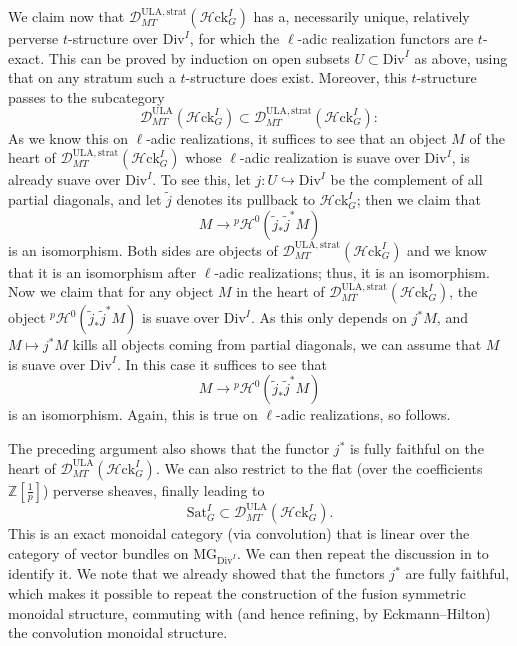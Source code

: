 \documentclass[11pt]{amsart}
\numberwithin{equation}{section}
\numberwithin{theorem}{section}
\theoremstyle{definition}
\newcommand{\Hloc}{{\mathcal H}{\mathrm{ck}}}
\begin{document}
We claim now that $\mathcal D_{MT}^{\mathrm{ULA},\mathrm{strat}}(\Hloc_G^I)$ has a, necessarily unique, relatively perverse $t$-structure over $\mathrm{Div}^I$, for which the $\ell$-adic realization functors are $t$-exact. This can be proved by induction on open subsets $U\subset \mathrm{Div}^I$ as above, using that on any stratum such a $t$-structure does exist. Moreover, this $t$-structure passes to the subcategory
\[
\mathcal D_{MT}^{\mathrm{ULA}}(\Hloc_G^I)\subset \mathcal D_{MT}^{\mathrm{ULA},\mathrm{strat}}(\Hloc_G^I):
\]
As we know this on $\ell$-adic realizations, it suffices to see that an object $M$ of the heart of $\mathcal D_{MT}^{\mathrm{ULA},\mathrm{strat}}(\Hloc_G^I)$ whose $\ell$-adic realization is suave over $\mathrm{Div}^I$, is already suave over $\mathrm{Div}^I$. To see this, let $j: U\hookrightarrow \mathrm{Div}^I$ be the complement of all partial diagonals, and let $\tilde{j}$ denotes its pullback to $\Hloc_G^I$; then we claim that
\[
M\to {}^p\mathcal H^0(\tilde{j}_\ast \tilde{j}^\ast M)
\]
is an isomorphism. Both sides are objects of $\mathcal D_{MT}^{\mathrm{ULA},\mathrm{strat}}(\Hloc_G^I)$ and we know that it is an isomorphism after $\ell$-adic realizations; thus, it is an isomorphism. Now we claim that for any object $M$ in the heart of $\mathcal D_{MT}^{\mathrm{ULA},\mathrm{strat}}(\Hloc_G^I)$, the object ${}^p\mathcal H^0(\tilde{j}_\ast \tilde{j}^\ast M)$ is suave over $\mathrm{Div}^I$. As this only depends on $j^\ast M$, and $M\mapsto j^\ast M$ kills all objects coming from partial diagonals, we can assume that $M$ is suave over $\mathrm{Div}^I$. In this case it suffices to see that
\[
M\to {}^p\mathcal H^0(\tilde{j}_\ast \tilde{j}^\ast M)
\]
is an isomorphism. Again, this is true on $\ell$-adic realizations, so follows.

The preceding argument also shows that the functor $j^\ast$ is fully faithful on the heart of $\mathcal D_{MT}^{\mathrm{ULA}}(\Hloc_G^I)$. We can also restrict to the flat (over the coefficients $\mathbb Z[\tfrac 1p]$) perverse sheaves, finally leading to
\[
\mathrm{Sat}_G^I\subset \mathcal D_{MT}^{\mathrm{ULA}}(\Hloc_G^I).
\]
This is an exact monoidal category (via convolution) that is linear over the category of vector bundles on $\mathrm{MG}_{\mathrm{Div}^I}$. We can then repeat the discussion in \cite{FarguesScholze} to identify it. We note that we already showed that the functors $j^\ast$ are fully faithful, which makes it possible to repeat the construction of the fusion symmetric monoidal structure, commuting with (and hence refining, by Eckmann--Hilton) the convolution monoidal structure.
\end{document}

